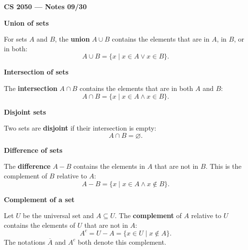 \documentclass[letterpaper]{article}
\newcommand{\noteheader}[1]{\par\bigskip\noindent\textbf{#1}\par\medskip}
\begin{document}
\textbf{CS 2050 --- Notes 09/30}

\noteheader{Union of sets}

For sets $A$ and $B$, the \textbf{union} $A\cup B$ contains the elements
that are in $A$, in $B$, or in both:
\[
A\cup B=\{x\mid x\in A\lor x\in B\}.
\]

\noteheader{Intersection of sets}

The \textbf{intersection} $A\cap B$ contains the elements that are in
both $A$ and $B$:
\[
A\cap B=\{x\mid x\in A\land x\in B\}.
\]

\noteheader{Disjoint sets}

Two sets are \textbf{disjoint} if their intersection is empty:
\[
A\cap B=\varnothing.
\]

\noteheader{Difference of sets}

The \textbf{difference} $A-B$ contains the elements in $A$ that are not
in $B$. This is the complement of $B$ relative to $A$:
\[
A-B=\{x\mid x\in A\land x\notin B\}.
\]

\clearpage

\noteheader{Complement of a set}

Let $U$ be the universal set and $A\subseteq U$. The \textbf{complement}
of $A$ relative to $U$ contains the elements of $U$ that are not in $A$:
\[
A^c=U-A=\{x\in U\mid x\notin A\}.
\]
The notations $\overline A$ and $A^c$ both denote this complement.
\end{document}
